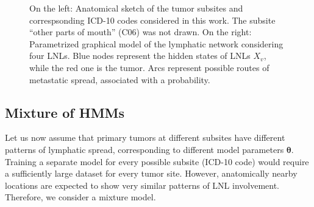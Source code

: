 \documentclass[11pt,twocolumn,twoside]{article}
\begin{document}
\begin{figure}[th]


\caption{\label{fig-schematic-and-graph}On the left: Anatomical sketch of the tumor subsites and correspsonding ICD-10 codes considered in this work. The subsite ``other parts of mouth'' (C06) was
not drawn. On the right: Parametrized graphical model of the
lymphatic network considering four LNLs. Blue nodes represent the hidden states of LNLs \(X_v\), while the red one is the tumor. Arcs represent possible routes of metastatic spread, associated with a probability.}
\end{figure}%

\subsection{Mixture of HMMs}\label{sec-mixture-of-hmms}

Let us now assume that primary tumors at different subsites have
different patterns of lymphatic spread, corresponding to different model
parameters \(\boldsymbol{\theta}\). Training a separate model for every
possible subsite (ICD-10 code) would require a sufficiently large
dataset for every tumor site. However, anatomically nearby locations are
expected to show very similar patterns of LNL involvement. Therefore, we
consider a mixture model.
\end{document}
